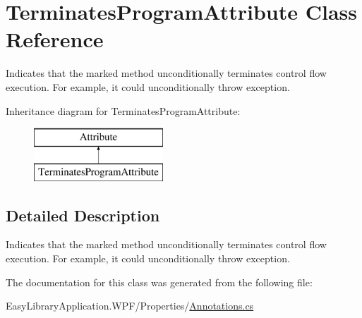 \hypertarget{class_terminates_program_attribute}{}\section{Terminates\+Program\+Attribute Class Reference}
\label{class_terminates_program_attribute}


Indicates that the marked method unconditionally terminates control flow execution. For example, it could unconditionally throw exception.  


Inheritance diagram for Terminates\+Program\+Attribute\+:\begin{figure}[H]
\begin{center}
\leavevmode
\includegraphics[height=2.000000cm]{class_terminates_program_attribute}
\end{center}
\end{figure}


\subsection{Detailed Description}
Indicates that the marked method unconditionally terminates control flow execution. For example, it could unconditionally throw exception. 



The documentation for this class was generated from the following file\+:\begin{DoxyCompactItemize}
\item 
Easy\+Library\+Application.\+W\+P\+F/\+Properties/\mbox{\hyperlink{_annotations_8cs}{Annotations.\+cs}}\end{DoxyCompactItemize}
